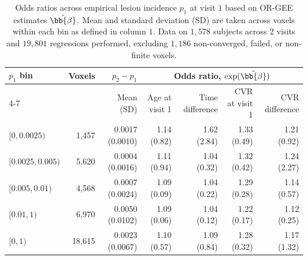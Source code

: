 \begin{table}[htbp]
\centering
\caption{Odds ratios across empirical lesion incidence $p_1$ at visit $1$ based on OR-GEE estimates $\hat{\bb{\beta}}$. Mean and standard deviation (SD) are taken across voxels within each bin as defined in column $1$. Data on $1{,}578$ subjects across $2$ visits and $19{,}801$ regressions performed, excluding $1{,}186$ non-converged, failed, or non-finite voxels.}
\label{tab:or-gee-odds-ratio-by-incidence}
\setlength{\tabcolsep}{5pt}
\renewcommand{\arraystretch}{1.12}
\begin{tabular}{lrrrrrr}
\toprule
$p_1$ bin & Voxels & $p_2 - p_1$ & \multicolumn{4}{c}{Odds ratio, $\exp(\hat{\bb{\beta}})$} \\
\cmidrule(lr){4-7}
& & Mean (SD) & Age at visit 1 & Time difference & CVR at visit 1 & CVR difference \\
\midrule
$[0, 0.0025)$ & 1,457 & 0.0017 (0.0010) & 1.14 (0.82) & 1.62 (2.84) & 1.33 (0.49) & 1.21 (0.92) \\
$[0.0025, 0.005)$ & 5,620 & 0.0004 (0.0016) & 1.11 (0.94) & 1.04 (0.32) & 1.32 (0.42) & 1.24 (2.27) \\
$[0.005, 0.01)$ & 4,568 & 0.0007 (0.0024) & 1.09 (0.09) & 1.04 (0.22) & 1.29 (0.28) & 1.14 (0.57) \\
$[0.01, 1)$ & 6,970 & 0.0050 (0.0102) & 1.09 (0.06) & 1.04 (0.12) & 1.22 (0.17) & 1.12 (0.25) \\
\midrule
$[0, 1)$ & 18,615 & 0.0023 (0.0067) & 1.10 (0.57) & 1.09 (0.84) & 1.28 (0.32) & 1.17 (1.32) \\
\bottomrule
\end{tabular}
\end{table}
